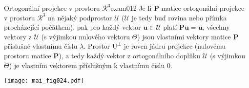 \begin{mathexam}{Ortogonální projekce v prostoru \(\mathcal{R}^3\)}{exam012}
    Je-li \(\mathbf{P}\) matice ortogonální projekce v prostoru \(\mathcal{R}^3\) na nějaký 
    podprostor \(\mathcal{U}\) (\(\mathcal{U}\) je tedy buď rovina nebo přímka procházející 
    počátkem), pak pro každý vektor \(\mathbf{u}\in\mathcal{U}\) platí \(\mathbf{Pu} = 
    \mathbf{u}\), všechny vektory z \(\mathcal{U}\) (s výjimkou nulového vektoru \(\Theta\)) 
    jsou vlastními vektory matice $\mathbf{P}$ příslušné vlastnímu číslu \(\lambda\). Prostor 
    \(\mathrm{U}^\bot\) je roven jádru projekce (nulovému prostoru matice \(\mathbf{P}\)), 
    a tedy každý vektor z ortogonálního doplňku \(\mathcal{U}\) (s výjimkou \(\Theta\)) je 
    vlastním vektorem příslušným k vlastnímu číslu \(0\).

    {\centering
      \captionsetup{type=figure}
      \texttt{[image: mai\_fig024.pdf]}
      \label{MAI:FIG016}
      \par}

\end{mathexam}